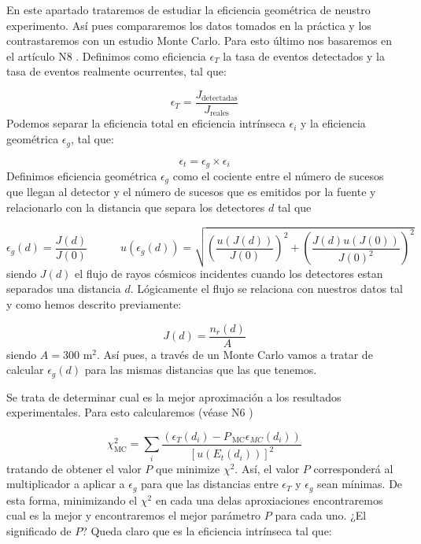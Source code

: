 \documentclass[11pt]{article}
\newcommand{\parentesis}[1]{\left( #1  \right)}
\newcommand{\ccorchetes}[1]{\left[ #1  \right]}
\newcommand{\tquad}{\quad \quad \quad}
\begin{document}
En este apartado trataremos de estudiar la eficiencia geométrica de neustro experimento. Así pues compararemos los datos tomados en la práctica y los contrastaremos con un estudio Monte Carlo. Para esto último nos basaremos en el artículo N8 \cite{N8}. Definimos como eficiencia $\epsilon_T$ la tasa de eventos detectados y la tasa de eventos realmente ocurrentes, tal que:

\begin{equation}
	\epsilon_T = \frac{J_{\text{detectadas}}}{J_{\text{reales}}}
\end{equation}
Podemos separar la eficiencia total en eficiencia intrínseca $\epsilon_i$ y la eficiencia geométrica $\epsilon_g$, tal que:

\begin{equation}
	\epsilon_t = \epsilon_g \times \epsilon_i
\end{equation}
Definimos eficiencia geométrica $\epsilon_g$ como el cociente entre el número de sucesos que llegan al detector y el número de sucesos que es emitidos por la fuente y relacionarlo con la distancia que separa los detectores $d$ \cite{Raul} tal que 

\begin{equation}
	\epsilon_g (d) = \frac{J(d)}{J(0)} \tquad 
	u(\epsilon_g(d)) = \sqrt{\parentesis{\frac{u(J(d))}{J(0)}}^2+\parentesis{\frac{J(d)u(J(0))}{J(0)^2}}^2}
\end{equation}
siendo $J(d)$ el flujo de rayos cósmicos incidentes cuando los detectores estan separados una distancia $d$. Lógicamente el flujo se relaciona con nuestros datos tal y como hemos descrito previamente: 

\begin{equation}
	J(d) = \frac{n_r(d)}{A}
\end{equation}
siendo $A=300$ m$^2$. Así pues, a través de un Monte Carlo vamos a tratar de calcular $\epsilon_g(d)$ para las mismas distancias que las que tenemos. 

Se trata de determinar cual es la mejor aproximación a los resultados experimentales. Para esto calcularemos (véase N6 \cite{N6})

\begin{equation}
	\chi^2_{\text{MC}} = \sum_i \frac{\parentesis{\epsilon_T(d_i)- P_{\
	\text{MC}} \epsilon_{MC}(d_i)}}{\ccorchetes{u(E_t(d_i))}^2}
\end{equation}
tratando de obtener el valor $P$ que minimize $\chi^2$. Así, el valor $P$ corresponderá al multiplicador a aplicar a $\epsilon_g$ para que las distancias entre $\epsilon_T$ y $\epsilon_g$ sean mínimas. De esta forma, minimizando el $\chi^2$ en cada una delas aproxiaciones encontraremos cual es la mejor y encontraremos el mejor parámetro $P$ para cada uno. ¿El significado de $P$? Queda claro que es la eficiencia intrínseca tal que:
\end{document}

